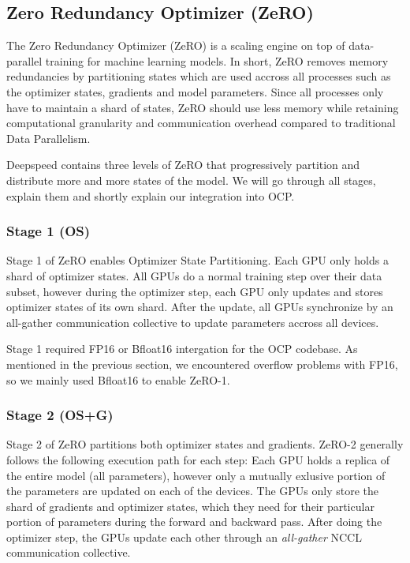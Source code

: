 \subsection{Zero Redundancy Optimizer (ZeRO)}
\label{subsection:zero}

The Zero Redundancy Optimizer (ZeRO) is a scaling engine on top of data-parallel training for 
machine learning models. In short, ZeRO removes memory redundancies by partitioning states which 
are used accross all processes such as the optimizer states, gradients and model parameters. 
Since all processes only have to maintain a shard of states, ZeRO should use less memory while 
retaining computational granularity and communication overhead compared to traditional Data 
Parallelism.

Deepspeed contains three levels of ZeRO that progressively partition and distribute more and 
more states of the model. We will go through all stages, explain them and shortly explain our 
integration into OCP.



\subsubsection{Stage 1 (OS)}

Stage 1 of ZeRO enables Optimizer State Partitioning. Each GPU only holds a shard of optimizer states.
All GPUs do a normal training step over their data subset, however during the optimizer step, each 
GPU only updates and stores optimizer states of its own shard. After the update, all GPUs synchronize 
by an all-gather communication collective to update parameters accross all devices.

Stage 1 required FP16 or Bfloat16 intergation for the OCP codebase. As mentioned in the previous 
section, we encountered overflow problems with FP16, so we mainly used Bfloat16 to enable ZeRO-1.

\subsubsection{Stage 2 (OS+G)}

Stage 2 of ZeRO partitions both optimizer states and gradients. ZeRO-2 generally follows the following 
execution path for each step: Each GPU holds a replica of the entire model (all parameters), however 
only a mutually exlusive portion of the parameters are updated on each of the devices. The GPUs only store 
the shard of gradients and optimizer states, which they need for their particular portion of parameters 
during the forward and backward pass. After doing the optimizer step, the GPUs update each other through 
an \textit{all-gather} NCCL communication collective. 


